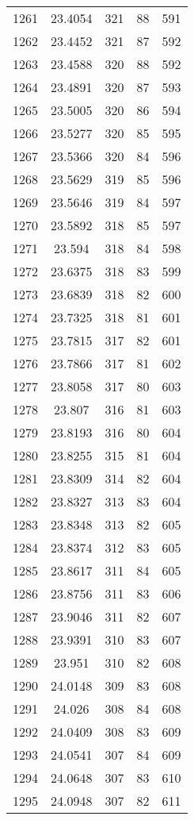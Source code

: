 \documentclass[12pt,a4paper]{article}
\begin{document}
\begin{tabular}{r|cccc}
	1261 & 23.4054 & 321 & 88 & 591 \\
	1262 & 23.4452 & 321 & 87 & 592 \\
	1263 & 23.4588 & 320 & 88 & 592 \\
	1264 & 23.4891 & 320 & 87 & 593 \\
	1265 & 23.5005 & 320 & 86 & 594 \\
	1266 & 23.5277 & 320 & 85 & 595 \\
	1267 & 23.5366 & 320 & 84 & 596 \\
	1268 & 23.5629 & 319 & 85 & 596 \\
	1269 & 23.5646 & 319 & 84 & 597 \\
	1270 & 23.5892 & 318 & 85 & 597 \\
	1271 & 23.594 & 318 & 84 & 598 \\
	1272 & 23.6375 & 318 & 83 & 599 \\
	1273 & 23.6839 & 318 & 82 & 600 \\
	1274 & 23.7325 & 318 & 81 & 601 \\
	1275 & 23.7815 & 317 & 82 & 601 \\
	1276 & 23.7866 & 317 & 81 & 602 \\
	1277 & 23.8058 & 317 & 80 & 603 \\
	1278 & 23.807 & 316 & 81 & 603 \\
	1279 & 23.8193 & 316 & 80 & 604 \\
	1280 & 23.8255 & 315 & 81 & 604 \\
	1281 & 23.8309 & 314 & 82 & 604 \\
	1282 & 23.8327 & 313 & 83 & 604 \\
	1283 & 23.8348 & 313 & 82 & 605 \\
	1284 & 23.8374 & 312 & 83 & 605 \\
	1285 & 23.8617 & 311 & 84 & 605 \\
	1286 & 23.8756 & 311 & 83 & 606 \\
	1287 & 23.9046 & 311 & 82 & 607 \\
	1288 & 23.9391 & 310 & 83 & 607 \\
	1289 & 23.951 & 310 & 82 & 608 \\
	1290 & 24.0148 & 309 & 83 & 608 \\
	1291 & 24.026 & 308 & 84 & 608 \\
	1292 & 24.0409 & 308 & 83 & 609 \\
	1293 & 24.0541 & 307 & 84 & 609 \\
	1294 & 24.0648 & 307 & 83 & 610 \\
	1295 & 24.0948 & 307 & 82 & 611 \\

\end{tabular}
\end{document}
